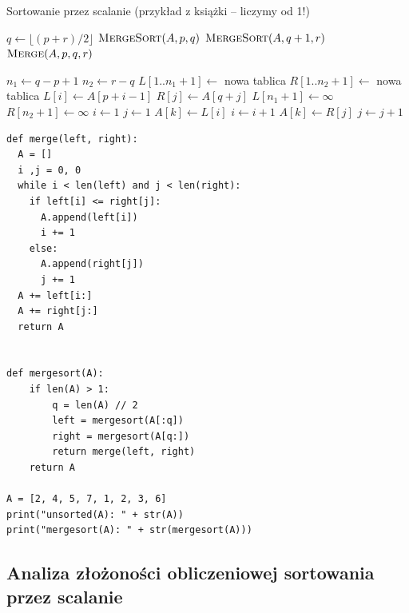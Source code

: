 \documentclass[10pt, oneside]{article}
\theoremstyle{remark}
\begin{document}
\begin{algorithm}
    \caption{Sortowanie przez scalanie (przykład z książki -- liczymy od 1!)}
    \label{merge_sort}
    \begin{algorithmic}[1] %
            		\State $q \gets \lfloor (p + r)/2 \rfloor$
            		\State $\Call{MergeSort}{A, p, q}$
            		\State $\Call{MergeSort}{A, q+1, r}$
            		\State $\Call{Merge}{A, p, q, r}$
            	\EndIf
        \EndFunction
        
            	\State $n_1 \gets q -p + 1$
            	\State $n_2 \gets r-q$
            	\State $L[1..n_{1}+1] \gets$ nowa tablica
            	\State $R[1..n_{2}+1] \gets$ nowa tablica
            		\State $L[i] \gets A[p+i-1]$ 
            	\EndFor
            		\State $R[j] \gets A[q+j]$ 
            	\EndFor
            	\State $L[n_1 + 1] \gets \infty$
            	\State $R[n_2 + 1] \gets \infty$
            	\State $i \gets 1$
            	\State $j \gets 1$
            			\State $A[k] \gets L[i]$
            			\State $i \gets i + 1$
            		\Else{}
            			\State $A[k] \gets R[j]$
            			\State $j \gets j + 1$
            		\EndIf
            	\EndFor
        \EndFunction
    \end{algorithmic}
\end{algorithm}

\begin{verbatim}
def merge(left, right):
  A = []
  i ,j = 0, 0
  while i < len(left) and j < len(right):
    if left[i] <= right[j]:
      A.append(left[i])
      i += 1
    else:
      A.append(right[j])
      j += 1
  A += left[i:]
  A += right[j:]
  return A


def mergesort(A):
	if len(A) > 1:
		q = len(A) // 2
		left = mergesort(A[:q])
		right = mergesort(A[q:])
		return merge(left, right)
	return A
	
A = [2, 4, 5, 7, 1, 2, 3, 6]
print("unsorted(A): " + str(A))
print("mergesort(A): " + str(mergesort(A)))
\end{verbatim}

\subsection{Analiza złożoności obliczeniowej sortowania przez scalanie}
\end{document}
